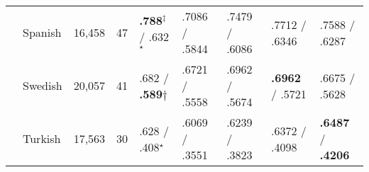 \begin{table}[ht]
\begin{flushleft}
\begin{tabular}{|@{ }l@{ }|@{ }l@{ }|@{ }l@{ }|@{ }l@{ }|@{ }l@{ }|@{ }l@{ }|@{ }l@{ }|@{ }l@{ }|@{ }l@{ }|}
        & Spanish    & 16,458  & 47   & {\bf.788}$^\ddagger$ / .632$^\star$          & .7086 / .5844 & .7479 / .6086  & .7712 / .6346     & .7588 / .6287 \\
        & Swedish    & 20,057  & 41   & .682 / {\bf.589}$\dagger$        & .6721 / .5558 & .6962 / .5674  & {\bf.6962} / .5721     & .6675 / .5628 \\
        & Turkish    & 17,563  & 30   & .628 / .408$^\star$        & .6069 / .3551 & .6239 / .3823  & .6372 / .4098 & {\bf.6487} / {\bf.4206} \\ \hline %
    \end{tabular}
  \end{flushleft}
\end{table}
